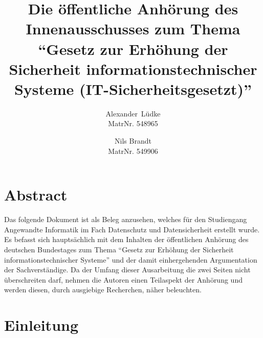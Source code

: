 \documentclass[a4paper,letterpaper,twocolumn,10pt,ngerman]{article}
\begin{document}
%
%

\date{}

\title{\Large \bf Die öffentliche Anhörung des Innenausschusses zum Thema "`Gesetz zur Erhöhung der Sicherheit informationstechnischer Systeme (IT-Sicherheitsgesetzt)"'}

\author{
{\rm Alexander\ Lüdke}\\
MatrNr. 548965
\and
{\rm Nils Brandt}\\
MatrNr. 549906
}

\maketitle

\thispagestyle{empty}

%
%

\section*{Abstract}
\label{sec:Abstract}
Das folgende Dokument ist als Beleg anzusehen, welches für den Studiengang Angewandte Informatik im Fach Datenschutz und Datensicherheit erstellt wurde. Es befasst sich hauptsächlich mit dem Inhalten der öffentlichen Anhörung des deutschen Bundestages zum Thema "`Gesetz zur Erhöhung der Sicherheit informationstechnischer Systeme"'  und der damit einhergehenden Argumentation der Sachverständige. Da der Umfang dieser Ausarbeitung die zwei Seiten nicht überschreiten darf, nehmen die Autoren einen Teilaspekt der Anhörung und werden diesen, durch ausgiebige Recherchen, näher beleuchten. 

\section{Einleitung}
\label{sec:Einleitung} 
\end{document}
